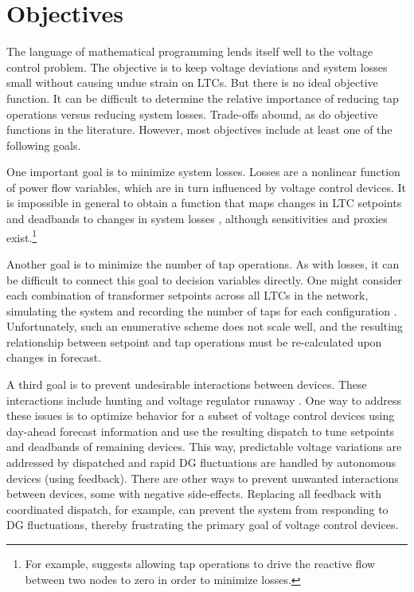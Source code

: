 \documentclass[10pt,letterpaper]{article}
\begin{document}
\section{Objectives}
\label{sec:objectives}
The language of mathematical programming lends itself well to the voltage control problem. The objective is to keep voltage deviations and system losses small without causing undue strain on LTCs. But there is no ideal objective function. It can be difficult to determine the relative importance of reducing tap operations versus reducing system losses. Trade-offs abound, as do objective functions in the literature. However, most objectives include at least one of the following goals.

One important goal is to minimize system losses. Losses are a nonlinear function of power flow variables, which are in turn influenced by voltage control devices. It is impossible in general to obtain a function that maps changes in LTC setpoints and deadbands to changes in system losses \cite{baghsorkhi2015}, although sensitivities and proxies exist.\footnote{For example, \cite{baghsorkhi2015} suggests allowing tap operations to drive the reactive flow between two nodes to zero in order to minimize losses.}

Another goal is to minimize the number of tap operations. As with losses, it can be difficult to connect this goal to decision variables directly. One might consider each combination of transformer setpoints across all LTCs in the network, simulating the system and recording the number of taps for each configuration \cite{baghsorkhi2015}. Unfortunately, such an enumerative scheme does not scale well, and the resulting relationship between setpoint and tap operations must be re-calculated upon changes in forecast.

A third goal is to prevent undesirable interactions between devices. These interactions include hunting \cite{walling2008,yorino1997} and voltage regulator runaway \cite{agalgaonkar2014}. One way to address these issues is to optimize behavior for a subset of voltage control devices using day-ahead forecast information and use the resulting dispatch to tune setpoints and deadbands of remaining devices. This way, predictable voltage variations are addressed by dispatched and rapid DG fluctuations are handled by autonomous devices (using feedback). There are other ways to prevent unwanted interactions between devices, some with negative side-effects. Replacing all feedback with coordinated dispatch, for example, can prevent the system from responding to DG fluctuations, thereby frustrating the primary goal of voltage control devices.
\end{document}
